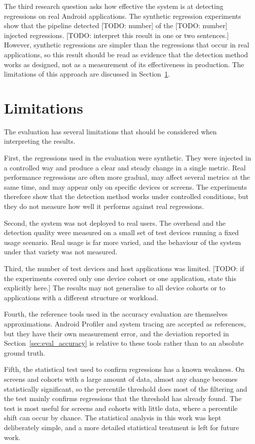 The third research question asks how effective the system is at detecting regressions on real Android applications. The synthetic regression experiments show that the pipeline detected [TODO: number] of the [TODO: number] injected regressions. [TODO: interpret this result in one or two sentences.] However, synthetic regressions are simpler than the regressions that occur in real applications, so this result should be read as evidence that the detection method works as designed, not as a measurement of its effectiveness in production. The limitations of this approach are discussed in Section~\ref{sec:eval_limitations}.

\section{Limitations}
\label{sec:eval_limitations}

The evaluation has several limitations that should be considered when interpreting the results.

First, the regressions used in the evaluation were synthetic. They were injected in a controlled way and produce a clear and steady change in a single metric. Real performance regressions are often more gradual, may affect several metrics at the same time, and may appear only on specific devices or screens. The experiments therefore show that the detection method works under controlled conditions, but they do not measure how well it performs against real regressions.

Second, the system was not deployed to real users. The overhead and the detection quality were measured on a small set of test devices running a fixed usage scenario. Real usage is far more varied, and the behaviour of the system under that variety was not measured.

Third, the number of test devices and host applications was limited. [TODO: if the experiments covered only one device cohort or one application, state this explicitly here.] The results may not generalise to all device cohorts or to applications with a different structure or workload.

Fourth, the reference tools used in the accuracy evaluation are themselves approximations. Android Profiler and system tracing are accepted as references, but they have their own measurement error, and the deviation reported in Section~\ref{sec:eval_accuracy} is relative to these tools rather than to an absolute ground truth.

Fifth, the statistical test used to confirm regressions has a known weakness. On screens and cohorts with a large amount of data, almost any change becomes statistically significant, so the percentile threshold does most of the filtering and the test mainly confirms regressions that the threshold has already found. The test is most useful for screens and cohorts with little data, where a percentile shift can occur by chance. The statistical analysis in this work was kept deliberately simple, and a more detailed statistical treatment is left for future work.

